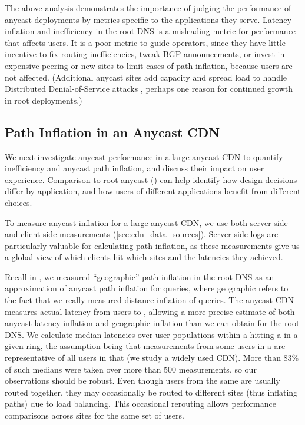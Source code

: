 \documentclass[sigconf,letterpaper,nonacm,10pt,anonymous]{acmart}
\begin{document}
The above analysis demonstrates the importance of judging the
performance of anycast deployments by metrics specific to the
applications they serve. Latency inflation and inefficiency in the root
DNS is a misleading metric for performance that affects users. It is a
poor metric to guide operators, since they have little incentive to fix
routing inefficiencies, tweak BGP announcements, or invest in expensive
peering or new sites to limit cases of path inflation, because users are
not affected. (Additional anycast sites add capacity and spread load to
handle Distributed Denial-of-Service attacks \cite{moura2016anycast},
perhaps one reason for continued growth in root deployments.)

\subsection{Path Inflation in an Anycast
CDN}\label{path-inflation-in-an-anycast-cdn}

\label{sec:cdn_anycast} We next investigate anycast performance in a
large anycast CDN to quantify inefficiency and anycast path inflation,
and discuss their impact on user experience. Comparison to root anycast
() can help identify how design decisions
differ by application, and how users of different applications benefit
from different choices.

To measure anycast inflation for a large anycast CDN, we use both
server-side and client-side measurements (\cref{sec:cdn_data_sources}).
Server-side logs are particularly valuable for calculating path
inflation, as these measurements give us a global view of which clients
hit which \fe sites and the latencies they achieved.

Recall in , we measured ``geographic'' path
inflation in the root DNS as an approximation of anycast path inflation
for queries, where geographic refers to the fact that we really measured
distance inflation of queries. The anycast CDN measures actual latency
from users to \feplural, allowing a more precise estimate of both
anycast latency inflation and geographic inflation than we can obtain
for the root DNS. We calculate median latencies over user populations
within a \metroas hitting a \fe in a given ring, the assumption being
that measurements from some users in a \metroas are representative of
all users in that \metroas (we study a widely used CDN). More than 83\%
of such medians were taken over more than 500 measurements, so our
observations should be robust. Even though users from the same
\metroas are usually routed together, they may occasionally be routed to
different sites (thus inflating paths) due to load balancing. This
occasional rerouting allows performance comparisons across sites for the
same set of users.
\end{document}
